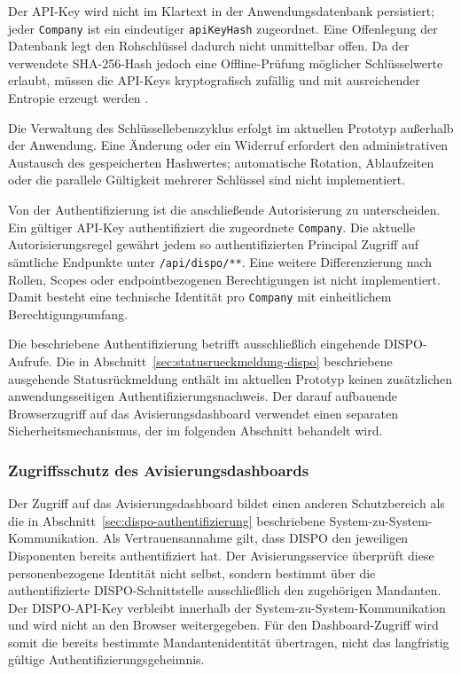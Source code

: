 Der API-Key wird nicht im Klartext in der Anwendungsdatenbank persistiert;
jeder \texttt{Company} ist ein eindeutiger \texttt{apiKeyHash} zugeordnet. Eine
Offenlegung der Datenbank legt den Rohschlüssel dadurch nicht unmittelbar
offen. Da der verwendete SHA-256-Hash jedoch eine Offline-Prüfung möglicher
Schlüsselwerte erlaubt, müssen die API-Keys kryptografisch zufällig und mit
ausreichender Entropie erzeugt werden
\parencite{owaspSecretsManagement}.

Die Verwaltung des Schlüssellebenszyklus erfolgt im aktuellen Prototyp
außerhalb der Anwendung. Eine Änderung oder ein Widerruf erfordert den
administrativen Austausch des gespeicherten Hashwertes; automatische Rotation,
Ablaufzeiten oder die parallele Gültigkeit mehrerer Schlüssel sind nicht
implementiert.

Von der Authentifizierung ist die anschließende Autorisierung zu unterscheiden.
Ein gültiger API-Key authentifiziert die zugeordnete \texttt{Company}. Die
aktuelle Autorisierungsregel gewährt jedem so authentifizierten Principal
Zugriff auf sämtliche Endpunkte unter \texttt{/api/dispo/**}. Eine weitere
Differenzierung nach Rollen, Scopes oder endpointbezogenen Berechtigungen ist
nicht implementiert. Damit besteht eine technische Identität pro
\texttt{Company} mit einheitlichem Berechtigungsumfang.

Die beschriebene Authentifizierung betrifft ausschließlich eingehende
DISPO-Aufrufe. Die in Abschnitt~\ref{sec:statusrueckmeldung-dispo} beschriebene
ausgehende Statusrückmeldung enthält im aktuellen Prototyp keinen zusätzlichen
anwendungsseitigen Authentifizierungsnachweis. Der darauf aufbauende
Browserzugriff auf das Avisierungsdashboard verwendet einen separaten
Sicherheitsmechanismus, der im folgenden Abschnitt behandelt wird.

\subsubsection{Zugriffsschutz des Avisierungsdashboards}
\label{sec:dashboard-zugriff}

Der Zugriff auf das Avisierungsdashboard bildet einen anderen Schutzbereich
als die in Abschnitt~\ref{sec:dispo-authentifizierung} beschriebene
System-zu-System-Kommunikation. Als Vertrauensannahme gilt, dass DISPO den
jeweiligen Disponenten bereits authentifiziert hat. Der
Avisierungsservice überprüft diese personenbezogene Identität nicht selbst,
sondern bestimmt über die authentifizierte DISPO-Schnittstelle ausschließlich
den zugehörigen Mandanten. Der DISPO-API-Key verbleibt innerhalb der
System-zu-System-Kommunikation und wird nicht an den Browser weitergegeben. Für
den Dashboard-Zugriff wird somit die bereits bestimmte Mandantenidentität
übertragen, nicht das langfristig gültige Authentifizierungsgeheimnis.

